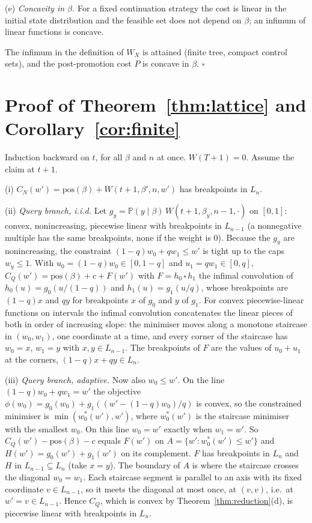 \documentclass{article}
\theoremstyle{plain}
\theoremstyle{definition}
\theoremstyle{remark}
\newcommand{\PP}{\mathbb{P}}
\newcommand{\pos}{\mathrm{pos}}
\begin{document}
(e) \emph{Concavity in $\beta$.} For a fixed continuation strategy the cost is linear in the initial state distribution and the feasible set does not depend on $\beta$; an infimum of linear functions is concave.

The infimum in the definition of $W_X$ is attained (finite tree, compact control sets), and the post-promotion cost $P$ is concave in $\beta$. \hfill$\square$

\section{Proof of Theorem~\ref{thm:lattice} and Corollary~\ref{cor:finite}}
\label{app:lattice}

Induction backward on $t$, for all $\beta$ and $n$ at once. $W(T+1)=0$. Assume the claim at $t+1$.

(i) $C_N(w')=\pos(\beta)+W(t+1,\beta',n,w')$ has breakpoints in $L_n$.

(ii) \emph{Query branch, i.i.d.} Let $g_y=\PP(y\mid\beta)\,W(t+1,\beta_y,n-1,\cdot)$ on $[0,1]$: convex, nonincreasing, piecewise linear with breakpoints in $L_{n-1}$ (a nonnegative multiple has the same breakpoints, none if the weight is 0). Because the $g_y$ are nonincreasing, the constraint $(1-q)w_0+qw_1\le w'$ is tight up to the caps $w_y\le1$. With $u_0=(1-q)w_0\in[0,1-q]$ and $u_1=qw_1\in[0,q]$, $C_Q(w')=\pos(\beta)+c+F(w')$ with $F=h_0\,\square\,h_1$ the infimal convolution of $h_0(u)=g_0(u/(1-q))$ and $h_1(u)=g_1(u/q)$, whose breakpoints are $(1-q)x$ and $qy$ for breakpoints $x$ of $g_0$ and $y$ of $g_1$. For convex piecewise-linear functions on intervals the infimal convolution concatenates the linear pieces of both in order of increasing slope: the minimiser moves along a monotone staircase in $(w_0,w_1)$, one coordinate at a time, and every corner of the staircase has $w_0=x$, $w_1=y$ with $x,y\in L_{n-1}$. The breakpoints of $F$ are the values of $u_0+u_1$ at the corners, $(1-q)x+qy\in L_n$.

(iii) \emph{Query branch, adaptive.} Now also $w_0\le w'$. On the line $(1-q)w_0+qw_1=w'$ the objective $\phi(w_0)=g_0(w_0)+g_1((w'-(1-q)w_0)/q)$ is convex, so the constrained minimiser is $\min(w_0^*(w'),w')$, where $w_0^*(w')$ is the staircase minimiser with the smallest $w_0$. On this line $w_0=w'$ exactly when $w_1=w'$. So $C_Q(w')-\pos(\beta)-c$ equals $F(w')$ on $A=\{w':w_0^*(w')\le w'\}$ and $H(w')=g_0(w')+g_1(w')$ on its complement. $F$ has breakpoints in $L_n$ and $H$ in $L_{n-1}\subseteq L_n$ (take $x=y$). The boundary of $A$ is where the staircase crosses the diagonal $w_0=w_1$. Each staircase segment is parallel to an axis with its fixed coordinate $v\in L_{n-1}$, so it meets the diagonal at most once, at $(v,v)$, i.e.\ at $w'=v\in L_{n-1}$. Hence $C_Q$, which is convex by Theorem~\ref{thm:reduction}(d), is piecewise linear with breakpoints in $L_n$.
\end{document}
